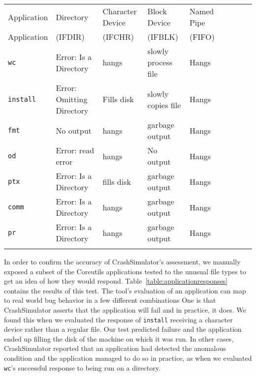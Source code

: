 \begin{table*}[t]
    \scriptsize{}
    \begin{tabular}{l  l  l  l  l  l  l  l  l}
    \toprule{}
        Application         & Directory                 & Character Device & Block Device  & Named Pipe \\
        Application         & (IFDIR)                   & (IFCHR) & (IFBLK) & (FIFO) \\
\hline
        {\tt wc}            & Error: Is a Directory     & hangs       & slowly process file  & Hangs\\
        {\tt install}       & Error: Omitting Directory & Fills disk  & slowly copies file   & Hangs\\
        {\tt fmt}           & No output                 & hangs       & garbage output       & Hangs\\
        {\tt od}            & Error: read error         & hangs       & No output            & Hangs\\
        {\tt ptx}           & Error: Is a Directory     & fills disk  & garbage output       & Hangs\\
        {\tt comm}          & Error: Is a Directory     & hangs       & garbage output       & Hangs\\
        {\tt pr}            & Error: Is a Directory     & hangs       & garbage output       & Hangs\\
\hline
    \bottomrule{}
    \end{tabular}
    \caption{Responses of a sample of coreutils applications when exposed to
      anomalous conditions.  The character device used was the infinite-length {\tt
        /dev/urandom}.}
    \label{table:applicationresponses}
\end{table*}


In order to confirm the accuracy of CrashSimulator's assessment, we manually
exposed a subset of the Coreutils applications tested to the unusual
file types to get an idea of how they would respond.
Table~\ref{table:applicationresponses} contains the results of this test.
The tool's evaluation of an application can map to real world bug behavior
in a few different combinations
One is that CrashSimulator asserts that the application will fail
and in practice, it does.  We found this when we evaluated
the response of  {\tt install} receiving a character device
rather than a regular file. Our test predicted failure and the
application ended up filling the disk of the machine on which it was run. In other cases, CrashSimulator reported that an
application had detected the anomalous condition and the application managed to
do so in practice,  as when we evaluated {\tt wc}'s successful response to
being run on a directory.


